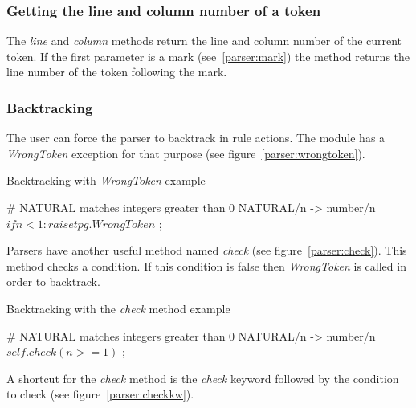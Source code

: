 
\subsubsection{Getting the line and column number of a token}

The \emph{line} and \emph{column} methods return the line and column number of the current token.
If the first parameter is a mark (see~\ref{parser:mark}) the method returns the line number of the token following the mark.

\subsubsection{Backtracking}

The user can force the parser to backtrack in rule actions.
The module has a \emph{WrongToken} exception for that purpose (see figure~\ref{parser:wrongtoken}).

\begin{code}
\caption{Backtracking with \emph{WrongToken} example}           \label{parser:wrongtoken}
\begin{verbatimtab}[4]
    # NATURAL matches integers greater than 0
    NATURAL/n ->
        number/n
        $ if n<1: raise tpg.WrongToken $
        ;
\end{verbatimtab}
\end{code}

Parsers have another useful method named \emph{check} (see figure~\ref{parser:check}).
This method checks a condition.
If this condition is false then \emph{WrongToken} is called in order to backtrack.

\begin{code}
\caption{Backtracking with the \emph{check} method example}     \label{parser:check}
\begin{verbatimtab}[4]
    # NATURAL matches integers greater than 0
    NATURAL/n ->
        number/n
        $ self.check(n>=1) $
        ;
\end{verbatimtab}
\end{code}

A shortcut for the \emph{check} method is the \emph{check} keyword followed by the condition to check (see figure~\ref{parser:checkkw}).

